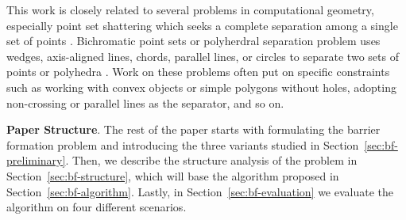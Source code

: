 This work is closely related to several problems in computational geometry, especially point set shattering which seeks a complete separation among a single set of points \cite{freimer1991complexity, har2020separating}. 
Bichromatic point sets or polyherdral separation problem uses wedges, axis-aligned lines, chords, parallel lines, or circles to separate two sets of points or polyhedra \cite{devillers2001separating,armaselu2017geometric,boissonnat2001circular, demaine2005separating}. 
Work on these problems often put on specific constraints such as working with convex objects or simple polygons without holes, adopting non-crossing or parallel lines as the separator, and so on. 

\noindent \textbf{Paper Structure}.
The rest of the paper starts with formulating the barrier formation problem and 
introducing the three variants studied in Section~\ref{sec:bf-preliminary}. 
Then, we describe the structure analysis of the problem in Section~\ref{sec:bf-structure}, which will base the algorithm
proposed in Section~\ref{sec:bf-algorithm}. Lastly, in Section~\ref{sec:bf-evaluation} we evaluate the algorithm on four different scenarios. %



